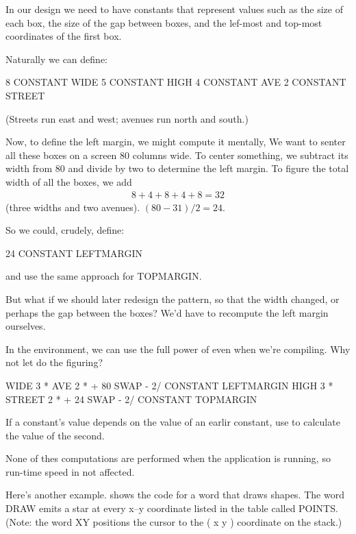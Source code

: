 In our design we need to have constants that represent values such as the size of each box, the size of the gap between boxes, and the lef-most and top-most coordinates of the first box.

Naturally we can define:

\begin{Code}
8 CONSTANT WIDE
5 CONSTANT HIGH
4 CONSTANT AVE
2 CONSTANT STREET
\end{Code}
(Streets run east and west; avenues run north and south.)

Now, to define the left margin, we might compute it mentally, We want to senter all these boxes on a screen 80 columns wide. To center something, we subtract its width from 80 and divide by two to determine the left margin. To figure the total width of all the boxes, we add
\begin{eqnarray}
8 + 4 + 8 + 4 + 8 = 32\nonumber
\end{eqnarray}
(three widths and two avenues). $(80-31) / 2 = 24$.

\goodbreak
So we could, crudely, define:

\begin{Code}
24 CONSTANT LEFTMARGIN
\end{Code}
and use the same approach for TOPMARGIN.

But what if we should later redesign the pattern, so that the width changed, or perhaps the gap between the boxes? We'd have to recompute the left margin ourselves.

In the \Forth{} environment, we can use the full power of \Forth{} even when we're compiling. Why not let \Forth{} do the figuring?

\begin{Code}
WIDE 3 *  AVE 2 *  +  80 SWAP -  2/ CONSTANT LEFTMARGIN
HIGH 3 *  STREET 2 * +  24 SWAP -  2/ CONSTANT TOPMARGIN
\end{Code}

\begin{tip}
If a constant's value depends on the value of an earlir constant, use
\Forth{} to calculate the value of the second.
\end{tip}
None of thes computations are performed when the application is running, so run-time speed in not affected.

Here's another example.  shows the code for a word that draws shapes. The word DRAW emits a star at every x--y coordinate listed in the table called POINTS. (Note: the word XY positions the cursor to the ( x y ) coordinate on the stack.)

